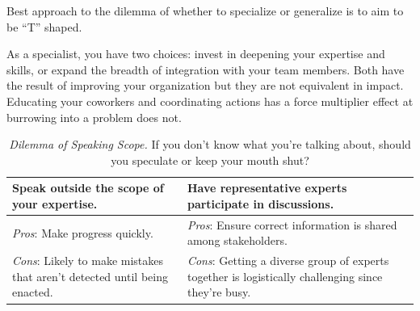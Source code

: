 Best approach to the dilemma of whether to specialize or generalize is to aim to be ``T'' shaped. 

As a specialist, you have two choices: invest in deepening your expertise and skills, or expand the breadth of integration with your team members. Both have the result of improving your organization but they are not equivalent in impact. Educating your coworkers and coordinating actions has a force multiplier effect at burrowing into a problem does not.



\begin{center}
\begin{table}[H] %
\begin{tabular}{ | m{\dilemmatablewidth}| m{\dilemmatablewidth} | }
  \hline
  \textbf{Speak outside the scope of your expertise.} & 
  \textbf{Have representative experts participate in discussions.} \\ 
  \hline
  \textit{Pros}: Make progress quickly. & 
  \textit{Pros}: Ensure correct information is shared among stakeholders. \\  
  \hline
  \textit{Cons}: Likely to make mistakes that aren't detected until being enacted. & 
  \textit{Cons}: Getting a diverse group of experts together is logistically challenging since they're busy. \\  
  \hline
\end{tabular}
\caption{
\textit{Dilemma of Speaking Scope.}
If you don't know what you're talking about, should you speculate or keep your mouth shut?
}
\label{table:dilemma-personal-scope-of-speaking}
\end{table}
\end{center}

